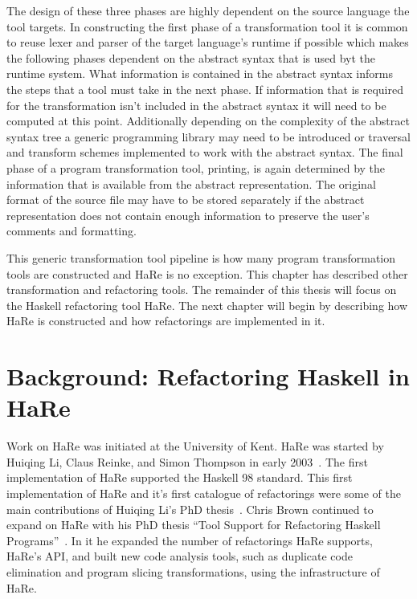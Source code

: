 The design of these three phases are highly dependent on the source language the tool targets. In constructing the first phase of a transformation tool it is common to reuse lexer and parser of the target language's runtime if possible which makes the following phases dependent on the abstract syntax that is used byt the runtime system. What information is contained in the abstract syntax informs the steps that a tool must take in the next phase. If information that is required for the transformation isn't included in the abstract syntax it will need to be computed at this point. Additionally depending on the complexity of the abstract syntax tree a generic programming library may need to be introduced or traversal and transform schemes implemented to work with the abstract syntax. The final phase of a program transformation tool, printing,  is again determined by the information that is available from the abstract representation. The original format of the source file may have to be stored separately if the abstract representation does not contain enough information to preserve the user's comments and formatting.

This generic transformation tool pipeline is how many program transformation tools are constructed and HaRe is no exception. This chapter has described other transformation and refactoring tools. The remainder of this thesis will focus on the Haskell refactoring tool HaRe. The next chapter will begin by describing how HaRe is constructed and how refactorings are implemented in it.

\chapter{Background: Refactoring Haskell in HaRe}
\label{chp:hare}


Work on HaRe was initiated at the University of Kent. HaRe was started by Huiqing Li, Claus Reinke, and Simon Thompson in early 2003~\citep{refacWebsite}. The first implementation of HaRe supported the Haskell 98 standard. This first implementation of HaRe and it's first catalogue of refactorings were some of the main contributions of Huiqing Li's PhD thesis~\citep{huiqingThesis}.  Chris Brown continued to expand on HaRe with his PhD thesis ``Tool Support for Refactoring Haskell Programs''~\citep{brownThesis}. In it he expanded the number of refactorings HaRe supports, HaRe's API, and built new code analysis tools, such as duplicate code elimination and program slicing transformations, using the infrastructure of HaRe.

